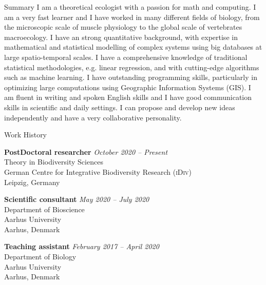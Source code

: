 \documentclass{resume} %
\begin{document}
\begin{rSection}{Summary}
I am a theoretical ecologist with a passion for math and computing.
I am a very fast learner and I have worked in many different fields of biology, from the microscopic scale of muscle physiology to the global scale of vertebrates macroecology.
I have an strong quantitative background, with expertise in mathematical and statistical modelling of complex systems using big databases at large spatio-temporal scales.
I have a comprehensive knowledge of traditional statistical methodologies, e.g. linear regression, and with cutting-edge algorithms such as machine learning.
I have outstanding programming skills, particularly in optimizing large computations using Geographic Information Systems (GIS).
I am fluent in writing and spoken English skills and I have good communication skills in scientific and daily settings.
I can propose and develop new ideas independently and have a very collaborative personality.
\end{rSection}

\begin{rSection}{Work History}

{\bf PostDoctoral researcher} \hfill {\em October 2020 -- Present}\\
Theory in Biodiversity Sciences\\
German Centre for Integrative Biodiversity Research (\textsc{iDiv})\\
Leipzig, Germany

{\bf Scientific consultant} \hfill {\em May 2020 -- July 2020}\\
Department of Bioscience\\
Aarhus University\\
Aarhus, Denmark

{\bf Teaching assistant} \hfill {\em February 2017 -- April 2020}
\\Department of Biology\\
Aarhus University\\
Aarhus, Denmark
\end{rSection}
\end{document}
